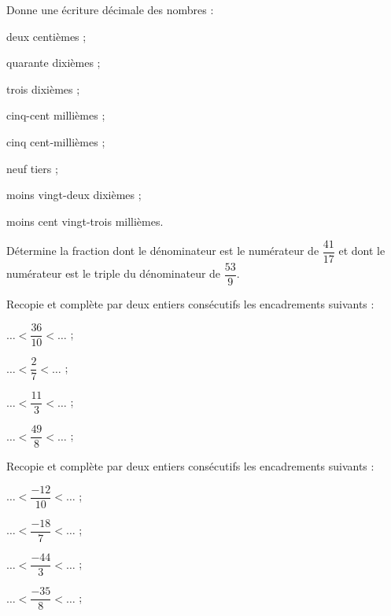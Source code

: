 \begin{exercice}
Donne une écriture décimale des nombres :
\begin{colenumerate}{2}
 \item deux centièmes ;
 \item quarante dixièmes ;
 \item trois dixièmes ;
 \item cinq-cent millièmes ;
 \item cinq cent‑millièmes ;
 \item neuf tiers ;
 \item moins vingt-deux \newline dixièmes ;
 \item moins cent vingt-trois \newline millièmes.
 \end{colenumerate}
\end{exercice}


\begin{exercice}
Détermine la fraction dont le dénominateur est le numérateur de $\dfrac{41}{17}$ et dont le numérateur est le triple du dénominateur de $\dfrac{53}{9}$.
\end{exercice}


\begin{exercice}
Recopie et complète par deux entiers consécutifs les encadrements suivants :
\begin{colenumerate}{2}
 \item $\ldots < \dfrac{36}{10} < \ldots$ ;
 \item $\ldots < \dfrac{2}{7} < \ldots$ ;
 \item $\ldots < \dfrac{11}{3} < \ldots$ ;
 \item $\ldots < \dfrac{49}{8} < \ldots$ ;
 \end{colenumerate}
\end{exercice}


\begin{exercice}
Recopie et complète par deux entiers consécutifs les encadrements suivants :
\begin{colenumerate}{2}
 \item $\ldots < \dfrac{- 12}{10} < \ldots$ ;
 \item $\ldots < \dfrac{- 18}{7} < \ldots$ ;
 \item $\ldots < \dfrac{-44}{3} < \ldots$ ;
 \item $\ldots < \dfrac{- 35}{8} < \ldots$ ;
 \end{colenumerate}
\end{exercice}


